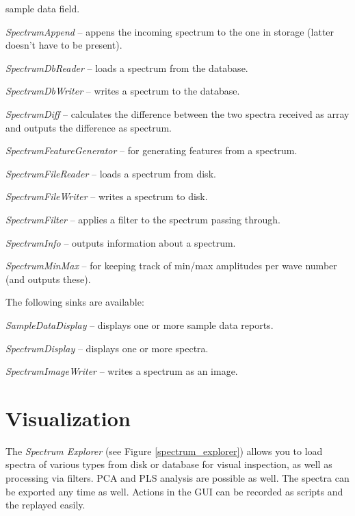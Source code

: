 \documentclass[a4paper]{book}
\begin{document}
\begin{tight_itemize}
  sample data field.
  \item \textit{SpectrumAppend} -- appens the incoming spectrum to the one
  in storage (latter doesn't have to be present).
  \item \textit{SpectrumDbReader} -- loads a spectrum from the database.
  \item \textit{SpectrumDbWriter} -- writes a spectrum to the database.
  \item \textit{SpectrumDiff} -- calculates the difference between the
  two spectra received as array and outputs the difference as spectrum.
  \item \textit{SpectrumFeatureGenerator} -- for generating features from
  a spectrum.
  \item \textit{SpectrumFileReader} -- loads a spectrum from disk.
  \item \textit{SpectrumFileWriter} -- writes a spectrum to disk.
  \item \textit{SpectrumFilter} -- applies a filter to the spectrum passing through.
  \item \textit{SpectrumInfo} -- outputs information about a spectrum.
  \item \textit{SpectrumMinMax} -- for keeping track of min/max amplitudes per
  wave number (and outputs these).
\end{tight_itemize}
The following sinks are available:
\begin{tight_itemize}
  \item \textit{SampleDataDisplay} -- displays one or more sample data reports.
  \item \textit{SpectrumDisplay} -- displays one or more spectra.
  \item \textit{SpectrumImageWriter} -- writes a spectrum as an image.
\end{tight_itemize}

\chapter{Visualization}
The \textit{Spectrum Explorer} (see Figure \ref{spectrum_explorer}) allows you
to load spectra of various types from disk or database for visual inspection,
as well as processing via filters. PCA and PLS analysis are possible as well.
The spectra can be exported any time as well.
Actions in the GUI can be recorded as scripts and the replayed easily.
\end{document}
